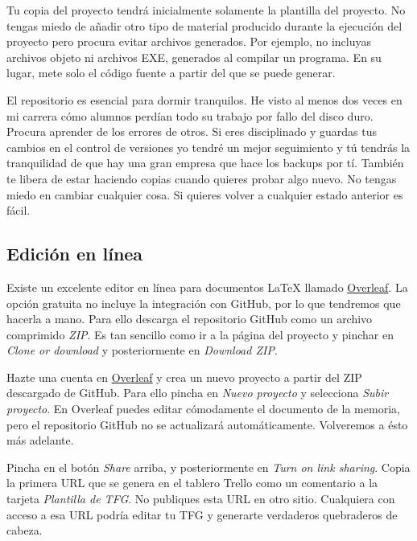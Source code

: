 Tu copia del proyecto tendrá inicialmente solamente la plantilla del proyecto.  No tengas miedo de añadir otro tipo de material producido durante la ejecución del proyecto pero procura evitar archivos generados.  Por ejemplo, no incluyas archivos objeto ni archivos EXE, generados al compilar un programa.  En su lugar, mete solo el código fuente a partir del que se puede generar.

El repositorio es esencial para dormir tranquilos.  He visto al menos dos veces en mi carrera cómo alumnos perdían todo su trabajo por fallo del disco duro.  Procura aprender de los errores de otros.  Si eres disciplinado y guardas tus cambios en el control de versiones yo tendré un mejor seguimiento y tú tendrás la tranquilidad de que hay una gran empresa que hace los backups por tí.  También te libera de estar haciendo copias cuando quieres probar algo nuevo.  No tengas miedo en cambiar cualquier cosa.  Si quieres volver a cualquier estado anterior es fácil.

\subsection{Edición en línea}
\label{sec:edicion-online}

Existe un excelente editor en línea para documentos \LaTeX{} llamado \href{https://overleaf.com}{Overleaf}.  La opción gratuita no incluye la integración con GitHub, por lo que tendremos que hacerla a mano.  Para ello descarga el repositorio GitHub como un archivo comprimido \emph{ZIP}.  Es tan sencillo como ir a la página del proyecto y pinchar en \emph{Clone or download} y posteriormente en \emph{Download ZIP}.

Hazte una cuenta en \href{https://overleaf.com}{Overleaf} y crea un nuevo proyecto a partir del ZIP descargado de GitHub. Para ello pincha en \emph{Nuevo proyecto} y selecciona \emph{Subir proyecto}.  En Overleaf puedes editar cómodamente el documento de la memoria, pero el repositorio GitHub no se actualizará automáticamente.  Volveremos a ésto más adelante.

Pincha en el botón \emph{Share} arriba, y posteriormente en \emph{Turn on link sharing}.  Copia la primera URL que se genera en el tablero Trello como un comentario a la tarjeta \emph{Plantilla de TFG}.  No publiques esta URL en otro sitio.  Cualquiera con acceso a esa URL podría editar tu TFG y generarte verdaderos quebraderos de cabeza.